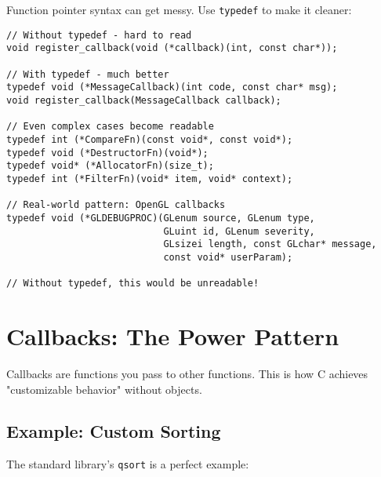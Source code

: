 Function pointer syntax can get messy. Use \texttt{typedef} to make it cleaner:

\begin{lstlisting}
// Without typedef - hard to read
void register_callback(void (*callback)(int, const char*));

// With typedef - much better
typedef void (*MessageCallback)(int code, const char* msg);
void register_callback(MessageCallback callback);

// Even complex cases become readable
typedef int (*CompareFn)(const void*, const void*);
typedef void (*DestructorFn)(void*);
typedef void* (*AllocatorFn)(size_t);
typedef int (*FilterFn)(void* item, void* context);

// Real-world pattern: OpenGL callbacks
typedef void (*GLDEBUGPROC)(GLenum source, GLenum type,
                            GLuint id, GLenum severity,
                            GLsizei length, const GLchar* message,
                            const void* userParam);

// Without typedef, this would be unreadable!
\end{lstlisting}

\section{Callbacks: The Power Pattern}

Callbacks are functions you pass to other functions. This is how C achieves "customizable behavior" without objects.

\subsection{Example: Custom Sorting}

The standard library's \texttt{qsort} is a perfect example:


